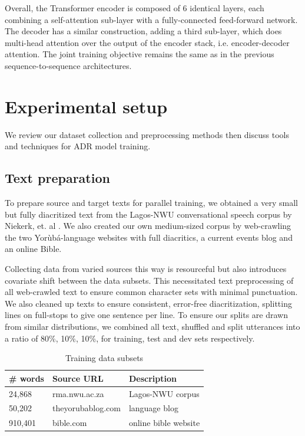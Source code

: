 \documentclass[a4paper]{article}
\begin{document}
Overall, the Transformer encoder is composed of 6 identical layers, each combining a self-attention sub-layer with a fully-connected feed-forward network. The decoder has a similar construction, adding a third sub-layer, which does multi-head attention over the output of the encoder stack, i.e. encoder-decoder attention. The joint training objective remains the same as in the previous sequence-to-sequence architectures.

\section{Experimental setup}

We review our dataset collection and preprocessing methods then discuss tools and techniques for ADR model training.

\subsection{Text preparation}

To prepare source and target texts for parallel training, we obtained a very small but fully diacritized text from the Lagos-NWU conversational speech corpus by Niekerk, et. al \cite{niekerk2012tone}. We also created our own medium-sized corpus by web-crawling the two Yor{\`u}b{\'a}-language websites with full diacritics, a current events blog and an online Bible. 

 Collecting data from varied sources this way is resourceful but also introduces covariate shift between the data subsets. This necessitated text preprocessing of all web-crawled text to ensure common character sets with minimal punctuation. We also cleaned up texts to ensure consistent, error-free diacritization, splitting lines on full-stops to give one sentence per line. To ensure our splits are drawn from similar distributions, we combined all text, shuffled and split utterances into a ratio of 80\%, 10\%, 10\%, for training, test and dev sets respectively.   
 \begin{table}[h]
  \caption{Training data subsets}
  \label{tab:training_datasets}
  \centering
  \begin{tabular}{lll}
    \toprule
    \textbf{\# words} & \textbf{Source URL}  & \textbf{Description} \\
    \midrule
    24,868 & rma.nwu.ac.za  & Lagos-NWU corpus \\  
    50,202 & theyorubablog.com & language blog\\  
    910,401 & bible.com & online bible website \\
    \bottomrule
  \end{tabular}
\end{table}
\end{document}
